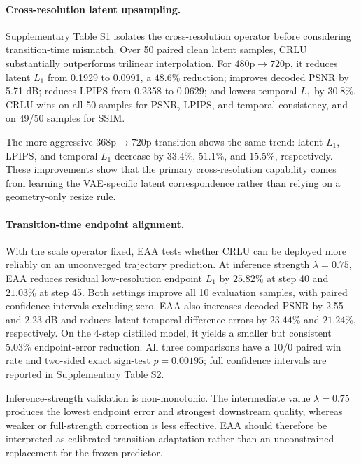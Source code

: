 \paragraph{Cross-resolution latent upsampling.}
Supplementary Table S1 isolates the cross-resolution operator before
considering transition-time mismatch. Over 50 paired clean latent samples,
CRLU substantially outperforms trilinear interpolation. For
\(480\text{p}\rightarrow720\text{p}\), it reduces latent \(L_1\) from
0.1929 to 0.0991, a \(48.6\%\) reduction; improves decoded PSNR by 5.71 dB;
reduces LPIPS from 0.2358 to 0.0629; and lowers temporal \(L_1\) by
\(30.8\%\). CRLU wins on all 50 samples for PSNR, LPIPS, and temporal
consistency, and on 49/50 samples for SSIM.

The more aggressive \(368\text{p}\rightarrow720\text{p}\) transition
shows the same trend: latent \(L_1\), LPIPS, and temporal \(L_1\) decrease by
\(33.4\%\), \(51.1\%\), and \(15.5\%\), respectively. These improvements
show that the primary cross-resolution capability comes from learning the
VAE-specific latent correspondence rather than relying on a geometry-only
resize rule.

\paragraph{Transition-time endpoint alignment.}
With the scale operator fixed, EAA tests whether CRLU can be deployed more
reliably on an unconverged trajectory prediction. At inference strength
\(\lambda=0.75\), EAA reduces residual low-resolution endpoint \(L_1\) by \(25.82\%\) at
step 40 and \(21.03\%\) at step 45. Both settings improve all 10 evaluation
samples, with paired confidence intervals excluding zero. EAA also increases
decoded PSNR by 2.55 and 2.23 dB and reduces latent temporal-difference errors
by \(23.44\%\) and \(21.24\%\), respectively. On the 4-step distilled model,
it yields a smaller but consistent \(5.03\%\) endpoint-error reduction. All
three comparisons have a 10/0 paired win rate and two-sided exact sign-test
\(p=0.00195\); full confidence intervals are reported in Supplementary Table
S2.

Inference-strength validation is non-monotonic. The intermediate value
\(\lambda=0.75\) produces the lowest endpoint error and strongest downstream quality,
whereas weaker or full-strength correction is less effective. EAA should
therefore be interpreted as calibrated transition adaptation rather than an
unconstrained replacement for the frozen predictor.


